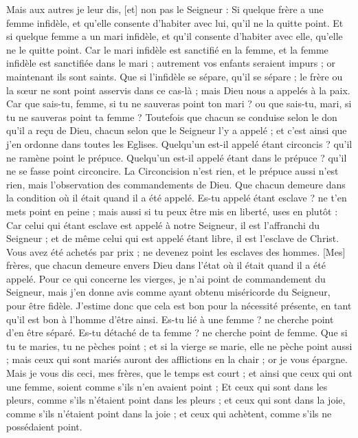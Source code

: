 \begin{multicols}{2}
Mais aux autres je leur dis, [et] non pas le Seigneur : Si quelque frère a une femme infidèle, et qu'elle consente d'habiter avec lui, qu'il ne la quitte point.
Et si quelque femme a un mari infidèle, et qu'il consente d'habiter avec elle, qu'elle ne le quitte point.
Car le mari infidèle est sanctifié en la femme, et la femme infidèle est sanctifiée dans le mari ; autrement vos enfants seraient impurs ; or maintenant ils sont saints.
Que si l'infidèle se sépare, qu'il se sépare ; le frère ou la sœur ne sont point asservis dans ce cas-là ; mais Dieu nous a appelés à la paix.
Car que sais-tu, femme, si tu ne sauveras point ton mari ? ou que sais-tu, mari, si tu ne sauveras point ta femme ?
Toutefois que chacun se conduise selon le don qu'il a reçu de Dieu, chacun selon que le Seigneur l'y a appelé ; et c'est ainsi que j'en ordonne dans toutes les Eglises.
Quelqu'un est-il appelé étant circoncis ? qu'il ne ramène point le prépuce. Quelqu'un est-il appelé étant dans le prépuce ? qu'il ne se fasse point circoncire.
La Circoncision n'est rien, et le prépuce aussi n'est rien, mais l'observation des commandements de Dieu.
Que chacun demeure dans la condition où il était quand il a été appelé.
Es-tu appelé étant esclave ? ne t'en mets point en peine ; mais aussi si tu peux être mis en liberté, uses en plutôt :
Car celui qui étant esclave est appelé à notre Seigneur, il est l'affranchi du Seigneur ; et de même celui qui est appelé étant libre, il est l'esclave de Christ.
Vous avez été achetés par prix ; ne devenez point les esclaves des hommes.
[Mes] frères, que chacun demeure envers Dieu dans l'état où il était quand il a été appelé.
Pour ce qui concerne les vierges, je n'ai point de commandement du Seigneur, mais j'en donne avis comme ayant obtenu miséricorde du Seigneur, pour être fidèle.
J'estime donc que cela est bon pour la nécessité présente, en tant qu'il est bon à l'homme d'être ainsi.
Es-tu lié à une femme ? ne cherche point d'en être séparé. Es-tu détaché de ta femme ? ne cherche point de femme.
Que si tu te maries, tu ne pèches point ; et si la vierge se marie, elle ne pèche point aussi ; mais ceux qui sont mariés auront des afflictions en la chair ; or je vous épargne.
Mais je vous dis ceci, mes frères, que le temps est court ; et ainsi que ceux qui ont une femme, soient comme s'ils n'en avaient point ;
Et ceux qui sont dans les pleurs, comme s'ils n'étaient point dans les pleurs ; et ceux qui sont dans la joie, comme s'ils n'étaient point dans la joie ; et ceux qui achètent, comme s'ils ne possédaient point.

\end{multicols}
